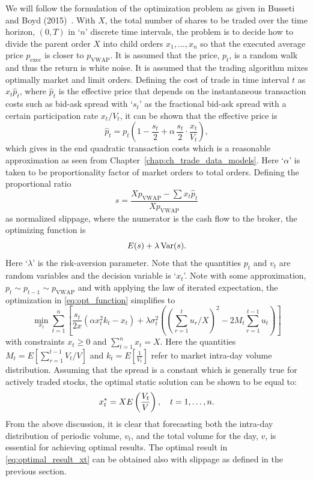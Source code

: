 We will follow the formulation of the optimization problem as given in Busseti and Boyd (2015)~\cite{busseli_boyd}. With $X$, the total number of shares to be traded over the time horizon, $(0,T)$ in `$n$' discrete time intervals, the problem is to decide how to divide the parent order $X$ into child orders $x_1, \ldots, x_n$ so that the executed average price $p_{\text{exec}}$ is closer to $p_{\text{VWAP}}$. It is assumed that the price, $p_t$, is a random walk and thus the return is white noise. It is assumed that the trading algorithm mixes optimally market and limit orders. Defining the cost of trade in time interval $t$ as $x_t \hat{p}_t$, where $\hat{p}_t$ is the effective price that depends on the instantaneous transaction costs such as bid-ask spread with `$s_t$' as the fractional bid-ask spread with a certain participation rate $x_t/V_t$, it can be shown that the effective price is
	\begin{equation}
	\hat{p}_t= p_t \left(1 - \dfrac{s_t}{2} + \alpha \, \dfrac{s_t}{2} \cdot \dfrac{x_t}{V_t} \right),
	\end{equation}
which gives in the end quadratic transaction costs which is a reasonable approximation as seen from Chapter~\ref{chap:ch_trade_data_models}. Here `$\alpha$' is taken to be proportionality factor of market orders to total orders. Defining the proportional ratio
	\begin{equation}
	s= \dfrac{X p_{\text{VWAP}} - \sum x_t \hat{p}_t}{X p_{\text{VWAP}}}
	\end{equation}
as normalized slippage, where the numerator is the cash flow to the broker, the optimizing function is
	\begin{equation} \label{eq:opt_function}
	E(s) + \lambda \var(s).
	\end{equation}
Here `$\lambda$' is the risk-aversion parameter. Note that the quantities $p_t$ and $v_t$ are random variables and the decision variable is `$x_t$'. Note with some approximation, $p_t \sim p_{t-1} \sim p_{\text{VWAP}}$ and with applying the law of iterated expectation, the optimization in \eqref{eq:opt_function} simplifies to
	\begin{equation}
	\min_{x_t} \sum_{t=1}^n \left[ \dfrac{s_t}{2x} (\alpha x_t^2 k_t - x_t) + \lambda \sigma_t^2 \left( \left( \sum_{r=1}^t u_r/X \right)^2 - 2 M_t \sum_{r=1}^{t-1} u_t \right) \right]
	\end{equation}
with constraints $x_t \geq 0$ and $\sum_{t=1}^n x_t = X$. Here the quantities $M_t= E \left[ \sum_{r=1}^{t-1} V_t/V \right]$ and $k_t= E[\frac{1}{V_t}]$ refer to market intra-day volume distribution. Assuming that the spread is a constant which is generally true for actively traded stocks, the optimal static solution can be shown to be equal to:
	\begin{equation} \label{eq:optimal_result_xt}
	x_t^*= X E\left(\dfrac{V_t}{V}\right), \enskip\enskip t=1,\ldots,n.
	\end{equation}
From the above discussion, it is clear that forecasting both the intra-day distribution of periodic volume, $v_t$, and the total volume for the day, $v$, is essential for achieving optimal results. The optimal result in \eqref{eq:optimal_result_xt} can be obtained also with slippage as defined in the previous section. \twomedskip


